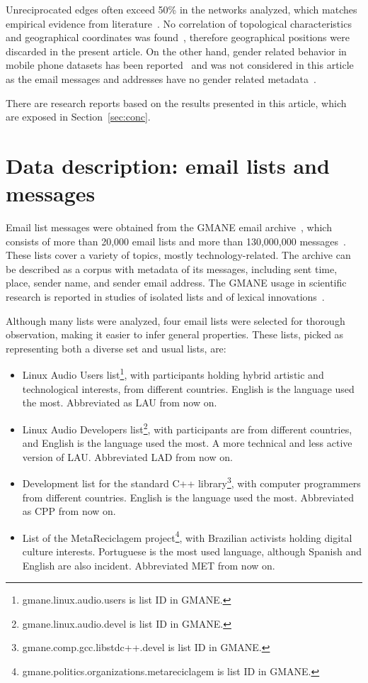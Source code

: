 \documentclass[%
 aip,
 jmp,%
 amsmath,amssymb,
 reprint,%
]{revtex4-1}
\begin{document}
Unreciprocated edges often exceed 50\% in the networks analyzed, which matches empirical evidence from literature~\cite{newmanEvolving}. No correlation of topological characteristics and geographical coordinates was found~\cite{barabasiGeo}, therefore geographical positions were discarded in the present article.
On the other hand, gender related behavior in mobile phone datasets has been reported~\cite{barabasiSex} and was not considered in this article as the email messages and addresses have no gender related metadata~\cite{GMANE}.

There are research reports based on the results presented in this article, which are exposed in Section~\ref{sec:conc}.

\section{Data description: email lists and messages}\label{sec:data}

Email list messages were obtained from
the GMANE email archive~\cite{GMANE}, which consists of more than 20,000 email lists and more than 130,000,000 messages~\cite{GMANEwikipedia}. These lists cover a variety of topics, mostly technology-related. The archive can be described as a corpus with metadata of its messages, including sent time, place, sender name, and sender email address.
The GMANE usage in scientific research is reported in studies of isolated lists and of lexical innovations~\cite{GMANE2,bird}. 

Although many lists were analyzed, four email lists were selected for thorough observation, making it easier to infer general properties. These lists, picked as representing both a diverse set and usual lists, are:
\begin{itemize}
    \item Linux Audio Users list\footnote{gmane.linux.audio.users is list ID in GMANE.}, with participants holding hybrid artistic and technological interests, from different countries. English is the language used the most. Abbreviated as LAU from now on.
    \item Linux Audio Developers list\footnote{gmane.linux.audio.devel is list ID in GMANE.}, with participants are from different countries, and English is the language used the most. A more technical and less active version of LAU. Abbreviated LAD from now on.
    \item Development list for the standard C++ library\footnote{gmane.comp.gcc.libstdc++.devel is list ID in GMANE.}, with computer programmers from different countries. English is the language used the most. Abbreviated as CPP from now on.
    \item List of the MetaReciclagem project\footnote{gmane.politics.organizations.metareciclagem is list ID in GMANE.}, with Brazilian activists holding digital culture interests. Portuguese is the most used language, although Spanish and English are also incident. Abbreviated MET from now on.
\end{itemize} 
\end{document}
